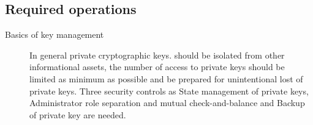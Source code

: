 \subsection{Required operations}

\begin{description}
 \item[Basics of key management]
       In general private cryptographic keys.
       should be isolated from other informational assets, the number of access to private keys should be limited as minimum as possible and be prepared for unintentional lost of private keys.
       Three security controls as State management of private keys, Administrator role separation and mutual check-and-balance and Backup of private key are needed.


\end{description}
